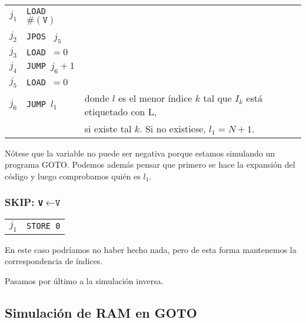 \documentclass[twoside]{article}
\begin{document}
\begin{tabular}{l l l}
$j_1$ & \texttt{LOAD }$\#(\texttt{V})$ &\\
$j_2$ & \texttt{JPOS } $j_{5}$ &\\
$j_3$ & \texttt{LOAD }$=0$ &\\
$j_4$ & \texttt{JUMP }$j_{6}+1$& \\
$j_5$ & \texttt{LOAD }$=0$\\
$j_6$ & \texttt{JUMP }$l_1$ & donde $l$ es el menor índice $k$ tal que $I_k$ está etiquetado con L,\\
 &                       &      si existe tal $k$. Si no existiese, $l_1=N+1$. 
\end{tabular}

\vspace{0.5cm}

Nótese que la variable no puede ser negativa porque estamos simulando un programa GOTO. Podemos además pensar que primero se hace la expansión del código y luego comprobamos quién es $l_1$.


\subsubsection{SKIP: \texttt{V}$\leftarrow\texttt{V}$}

\begin{tabular}{l l}
$j_1$ &  \texttt{STORE 0}
\end{tabular}

\vspace{0.5cm}

En este caso podríamos no haber hecho nada, pero de esta forma mantenemos la correspondencia de índices.


Pasamos por último a la simulación inversa.

\subsection{Simulación de RAM en GOTO}
\end{document}
